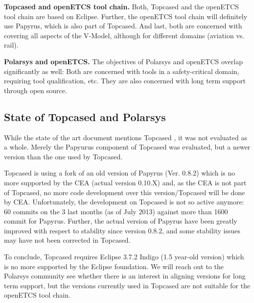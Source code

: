 \textbf{Topcased and openETCS tool chain.} Both, Topcased and the openETCS tool chain are based on Eclipse.  Further, the openETCS tool chain will definitely use Papyrus, which is also part of Topcased.  And last, both are concerned with covering all aspects of the V-Model, although for different domains (aviation vs. rail).

\textbf{Polarsys and openETCS.}  The objectives of Polarsys and openETCS overlap significantly as well: Both are concerned with tools in a safety-critical domain, requiring tool qualification, etc.  They are also concerned with long term support through open source.

\subsection{State of Topcased and Polarsys}

While the state of the art document mentions Topcased \cite{}, it was not evaluated as a whole.  Merely the Papyurus component of Topcased was evaluated, but a newer version than the one used by Topcased.

Topcased is using a fork of an old version of Papyrus (Ver. 0.8.2) which is no more supported by the CEA (actual version 0.10.X) and, as the CEA is not part of Topcased, no more code development over this version/Topcased will be done by CEA.  Unfortunately, the development on Topcased is not so active anymore: 60 commits on the 3 last months (as of July 2013) against more than 1600 commit for Papyrus.  Further, the actual version of Papyrus have been greatly improved with respect to stability since version 0.8.2, and some stability issues may have not been corrected in Topcased.

To conclude, Topcased requires Eclipse 3.7.2 Indigo (1.5 year-old version) which is no more supported by the Eclipse foundation.  We will reach out to the Polarsys community see whether there is an interest in aligning versions for long term support, but the versions currently used in Topcased are not suitable for the openETCS tool chain.

